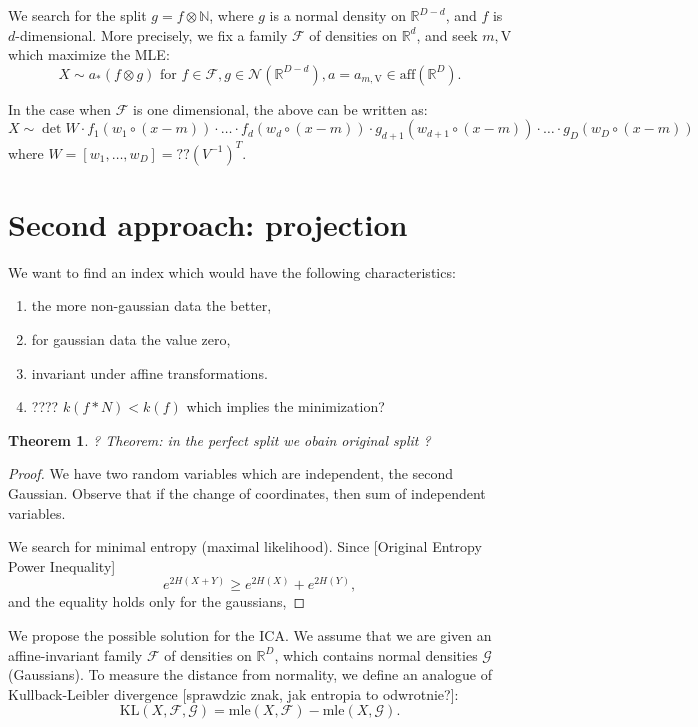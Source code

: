 \documentclass[12pt]{article}
\def\N{\mathbb{N}}
\def\R{\mathbb{R}}
\def\v{\mathrm{V}}
\def\F{\mathcal{F}}
\def\G{\mathcal{G}}
\def\KL{\mathrm{KL}}
\def\mle{\mathrm{mle}}
\def\aff{\mathrm{aff}}
\def\nor{\mathcal{N}}
\newtheorem{theorem}{Theorem}[section]
\theoremstyle{definition}
\begin{document}
We search for the split $g=f \otimes \N$, where $g$ is a normal density on $\R^{D-d}$,
and $f$ is $d$-dimensional. More precisely, we fix a family $\F$ of densities on $\R^d$, and seek $m,\v$ which maximize the MLE:
$$
X \sim a_*(f \otimes g) \text{ for } f \in \F, g \in \nor(\R^{D-d}), a=a_{m,\v} \in \aff(\R^D). 
$$

In the case when $\F$ is one dimensional, the above can be written as:
$$
X \sim \det W \cdot f_1(w_1 \circ (x-m)) \cdot \ldots \cdot f_d(w_d \circ (x-m))
\cdot g_{d+1}(w_{d+1} \circ (x-m)) \cdot \ldots \cdot g_D(w_D \circ (x-m))
$$
where $W=[w_1,\ldots,w_D]=??(V^{-1})^T$.


\section{Second approach: projection}

We want to find an index which would have the following characteristics:
\begin{enumerate}
\item the more non-gaussian data the better,
\item for gaussian data the value zero,
\item invariant under affine transformations.
\item ???? $k(f * N) <k(f)$ which implies the minimization?
\end{enumerate}

\begin{theorem}
? Theorem: in the perfect split we obain original split ?
\end{theorem}

\begin{proof}
We have two random variables which are independent, the second Gaussian.
Observe that if the change of coordinates, then sum of independent variables.

We search for minimal entropy (maximal likelihood). Since
[Original Entropy Power Inequality]
$$
e^{2H(X+Y)} \geq e^{2H(X)}+e^{2H(Y)},
$$
and the equality holds only for the gaussians, 
\end{proof}

We propose the possible solution for the ICA. We assume that we are given an affine-invariant family
$\F$ of densities on $\R^D$, which contains normal densities $\G$ (Gaussians). To measure the distance from 
normality, we define an analogue of Kullback-Leibler divergence [sprawdzic znak, jak entropia to odwrotnie?]:
$$
\KL(X,\F,\G)=\mle(X,\F)-\mle(X,\G).
$$
\end{document}
